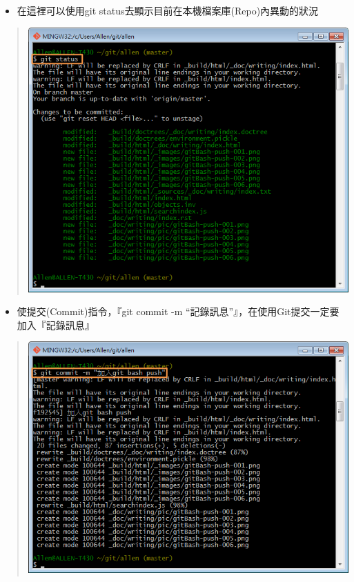 \documentclass[letterpaper,10pt,english]{sphinxmanual}
\begin{document}
\begin{itemize}
\item {} 
在這裡可以使用git status去顯示目前在本機檔案庫(Repo)內異動的狀況

\end{itemize}
\begin{quote}

\includegraphics{gitBash-push-003.png}
\end{quote}
\begin{itemize}
\item {} 
使提交(Commit)指令，『git commit -m ``記錄訊息''』，在使用Git提交一定要加入『記錄訊息』

\end{itemize}
\begin{quote}

\includegraphics{gitBash-push-004.png}
\end{quote}
\end{document}
